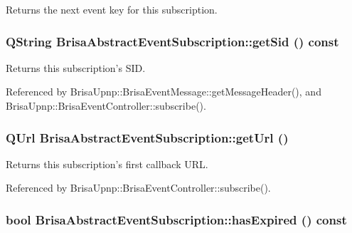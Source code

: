 Returns the next event key for this subscription. \hypertarget{classBrisaUpnp_1_1BrisaAbstractEventSubscription_a568db6180782a15620432fd163b87f63}{
\subsubsection[{getSid}]{\setlength{\rightskip}{0pt plus 5cm}QString BrisaAbstractEventSubscription::getSid () const}}
\label{classBrisaUpnp_1_1BrisaAbstractEventSubscription_a568db6180782a15620432fd163b87f63}


Returns this subscription's SID. 

Referenced by BrisaUpnp::BrisaEventMessage::getMessageHeader(), and BrisaUpnp::BrisaEventController::subscribe().\hypertarget{classBrisaUpnp_1_1BrisaAbstractEventSubscription_a4d20b50a2d27923138d42d036a1416cd}{
\subsubsection[{getUrl}]{\setlength{\rightskip}{0pt plus 5cm}QUrl BrisaAbstractEventSubscription::getUrl ()}}
\label{classBrisaUpnp_1_1BrisaAbstractEventSubscription_a4d20b50a2d27923138d42d036a1416cd}


Returns this subscription's first callback URL. 

Referenced by BrisaUpnp::BrisaEventController::subscribe().\hypertarget{classBrisaUpnp_1_1BrisaAbstractEventSubscription_aef4109da165b4a2120d92f2bc81ead16}{
\subsubsection[{hasExpired}]{\setlength{\rightskip}{0pt plus 5cm}bool BrisaAbstractEventSubscription::hasExpired () const}}
\label{classBrisaUpnp_1_1BrisaAbstractEventSubscription_aef4109da165b4a2120d92f2bc81ead16}


